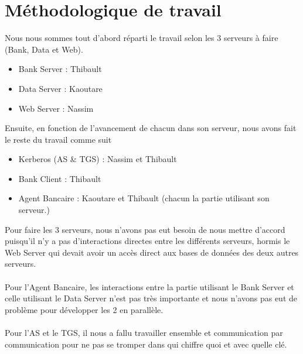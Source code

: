 \documentclass[11pt,fleqn]{article}
\begin{document}
\tableofcontents

\newpage


\section{Méthodologique de travail}
Nous nous sommes tout d'abord réparti le travail selon les 3 serveurs à faire (Bank, Data et Web).\\
\begin{itemize}
	\item Bank Server : Thibault
	\item Data Server : Kaoutare
	\item Web Server : Nassim
\end{itemize}
Ensuite, en fonction de l'avancement de chacun dans son serveur, nous avons fait le reste du travail comme suit
\begin{itemize}
	\item Kerberos (AS \& TGS) : Nassim et Thibault
	\item Bank Client : Thibault
	\item Agent Bancaire : Kaoutare et Thibault (chacun la partie utilisant son serveur.)
\end{itemize}
Pour faire les 3 serveurs, nous n'avons pas eut besoin de nous mettre d'accord puisqu'il n'y a pas d'interactions directes entre les différents serveurs, hormis le Web Server qui devait avoir un accès direct aux bases de données des deux autres serveurs.\\\\
Pour l'Agent Bancaire, les interactions entre la partie utilisant le Bank Server et celle utilisant le Data Server n'est pas très importante et nous n'avons pas eut de problème pour développer les 2 en parallèle.\\\\
Pour l'AS et le TGS, il nous a fallu travailler ensemble et communication par communication pour ne pas se tromper dans qui chiffre quoi et avec quelle clé.
\end{document}
